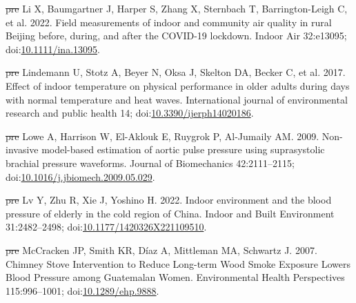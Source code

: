 \documentclass[
  letterpaper,
  DIV=11,
  numbers=noendperiod]{scrartcl}
\newlength{\cslhangindent}
\newenvironment{CSLReferences}[2] %
 {\begin{list}{}{%
  \setlength{\itemindent}{0pt} %
  \setlength{\leftmargin}{0pt} %
  \setlength{\parsep}{0pt} %
  \ifodd #1
   \setlength{\leftmargin}{\cslhangindent} %
   \setlength{\itemindent}{-1\cslhangindent} %
  \fi
  \setlength{\itemsep}{#2\baselineskip}}} %
 {\end{list}} %
\providecommand{\DIFdel}[1]{{\protect\color{red}\sout{#1}}}                      %
\providecommand{\DIFaddbegin}{} %
\providecommand{\DIFaddend}{} %
\providecommand{\DIFdelbegin}{} %
\providecommand{\DIFdelend}{} %
\newcommand{\DIFscaledelfig}{0.5}
\newlength{\DIFdelgraphicswidth} %
\newlength{\DIFdelgraphicsheight} %
\newcommand{\DIFaddincludegraphics}[2][]{{\color{blue}\fbox{\DIFOincludegraphics[#1]{#2}}}} %
\newcommand{\DIFdelincludegraphics}[2][]{%
\sbox{\DIFdelgraphicsbox}{\DIFOincludegraphics[#1]{#2}}%
\settoboxwidth{\DIFdelgraphicswidth}{\DIFdelgraphicsbox} %
\settoboxtotalheight{\DIFdelgraphicsheight}{\DIFdelgraphicsbox} %
\scalebox{\DIFscaledelfig}{%
\parbox[b]{\DIFdelgraphicswidth}{\usebox{\DIFdelgraphicsbox}\\[-\baselineskip] \rule{\DIFdelgraphicswidth}{0em}}\llap{\resizebox{\DIFdelgraphicswidth}{\DIFdelgraphicsheight}{%
\setlength{\unitlength}{\DIFdelgraphicswidth}%
\begin{picture}(1,1)%
\thicklines\linethickness{2pt} %
{\color[rgb]{1,0,0}\put(0,0){\framebox(1,1){}}}%
{\color[rgb]{1,0,0}\put(0,0){\line( 1,1){1}}}%
{\color[rgb]{1,0,0}\put(0,1){\line(1,-1){1}}}%
\end{picture}%
}\hspace*{3pt}}} %
} %
\DeclareRobustCommand{\DIFaddbegin}{\DIFOaddbegin \let\includegraphics\DIFaddincludegraphics} %
\DeclareRobustCommand{\DIFaddend}{\DIFOaddend \let\includegraphics\DIFOincludegraphics} %
\DeclareRobustCommand{\DIFdelbegin}{\DIFOdelbegin \let\includegraphics\DIFdelincludegraphics} %
\DeclareRobustCommand{\DIFdelend}{\DIFOaddend \let\includegraphics\DIFOincludegraphics} %
\begin{document}
\begin{CSLReferences}{1}{1}
\DIFdelbegin %
\DIFdel{pre}%
\DIFdelend \DIFaddbegin {}
\DIFaddend Li X, Baumgartner J, Harper S, Zhang X, Sternbach T, Barrington-Leigh C,
et al. 2022. Field measurements of indoor and community air quality in
rural {Beijing} before, during, and after the {COVID-19} lockdown.
Indoor Air 32:e13095;
doi:\href{https://doi.org/10.1111/ina.13095}{10.1111/ina.13095}.

\DIFdelbegin %
\DIFdel{pre}%
\DIFdelend \DIFaddbegin {}
\DIFaddend Lindemann U, Stotz A, Beyer N, Oksa J, Skelton DA, Becker C, et al.
2017. Effect of indoor temperature on physical performance in older
adults during days with normal temperature and heat waves. International
journal of environmental research and public health 14;
doi:\href{https://doi.org/10.3390/ijerph14020186}{10.3390/ijerph14020186}.

\DIFdelbegin %
\DIFdel{pre}%
\DIFdelend \DIFaddbegin {}
\DIFaddend Lowe A, Harrison W, El-Aklouk E, Ruygrok P, Al-Jumaily AM. 2009.
Non-invasive model-based estimation of aortic pulse pressure using
suprasystolic brachial pressure waveforms. Journal of Biomechanics
42:2111--2115;
doi:\href{https://doi.org/10.1016/j.jbiomech.2009.05.029}{10.1016/j.jbiomech.2009.05.029}.

\DIFdelbegin %
\DIFdel{pre}%
\DIFdelend \DIFaddbegin {}
\DIFaddend Lv Y, Zhu R, Xie J, Yoshino H. 2022. Indoor environment and the blood
pressure of elderly in the cold region of {China}. Indoor and Built
Environment 31:2482--2498;
doi:\href{https://doi.org/10.1177/1420326X221109510}{10.1177/1420326X221109510}.

\DIFdelbegin %
\DIFdel{pre}%
\DIFdelend \DIFaddbegin {}
\DIFaddend McCracken JP, Smith KR, Díaz A, Mittleman MA, Schwartz J. 2007. Chimney
{Stove Intervention} to {Reduce Long-term Wood Smoke Exposure Lowers
Blood Pressure} among {Guatemalan Women}. Environmental Health
Perspectives 115:996--1001;
doi:\href{https://doi.org/10.1289/ehp.9888}{10.1289/ehp.9888}.


\end{CSLReferences}
\end{document}

